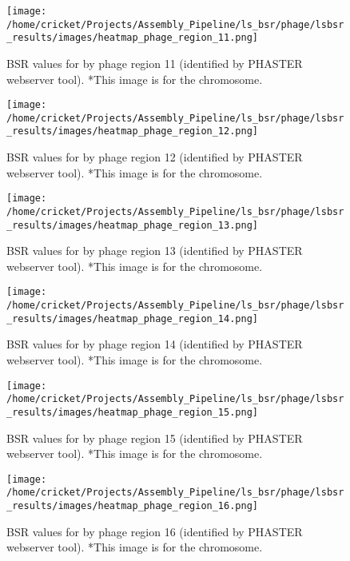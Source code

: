 \documentclass[11pt]{article}
\begin{document}
\begin{figure}[ht!]\normalsize %
\centering
\texttt{[image: /home/cricket/Projects/Assembly\_Pipeline/ls\_bsr/phage/lsbsr\_results/images/heatmap\_phage\_region\_11.png]} 
\caption{BSR values for by phage region 11 (identified by PHASTER webserver tool). *This image is for the chromosome.}
\label{phage_11}
\end{figure}

\clearpage

\begin{figure}[ht!]\normalsize %
\centering
\texttt{[image: /home/cricket/Projects/Assembly\_Pipeline/ls\_bsr/phage/lsbsr\_results/images/heatmap\_phage\_region\_12.png]} 
\caption{BSR values for by phage region 12 (identified by PHASTER webserver tool). *This image is for the chromosome.}
\label{phage_12}
\end{figure}

\begin{figure}[ht!]\normalsize %
\centering
\texttt{[image: /home/cricket/Projects/Assembly\_Pipeline/ls\_bsr/phage/lsbsr\_results/images/heatmap\_phage\_region\_13.png]} 
\caption{BSR values for by phage region 13 (identified by PHASTER webserver tool). *This image is for the chromosome.}
\label{phage_13}
\end{figure}

\clearpage

\begin{figure}[ht!]\normalsize %
\centering
\texttt{[image: /home/cricket/Projects/Assembly\_Pipeline/ls\_bsr/phage/lsbsr\_results/images/heatmap\_phage\_region\_14.png]} 
\caption{BSR values for by phage region 14 (identified by PHASTER webserver tool). *This image is for the chromosome.}
\label{phage_14}
\end{figure}

\begin{figure}[ht!]\normalsize %
\centering
\texttt{[image: /home/cricket/Projects/Assembly\_Pipeline/ls\_bsr/phage/lsbsr\_results/images/heatmap\_phage\_region\_15.png]} 
\caption{BSR values for by phage region 15 (identified by PHASTER webserver tool). *This image is for the chromosome.}
\label{phage_15}
\end{figure}

\clearpage

\begin{figure}[ht!]\normalsize %
\centering
\texttt{[image: /home/cricket/Projects/Assembly\_Pipeline/ls\_bsr/phage/lsbsr\_results/images/heatmap\_phage\_region\_16.png]} 
\caption{BSR values for by phage region 16 (identified by PHASTER webserver tool). *This image is for the chromosome.}
\label{phage_16}
\end{figure}
\end{document}
